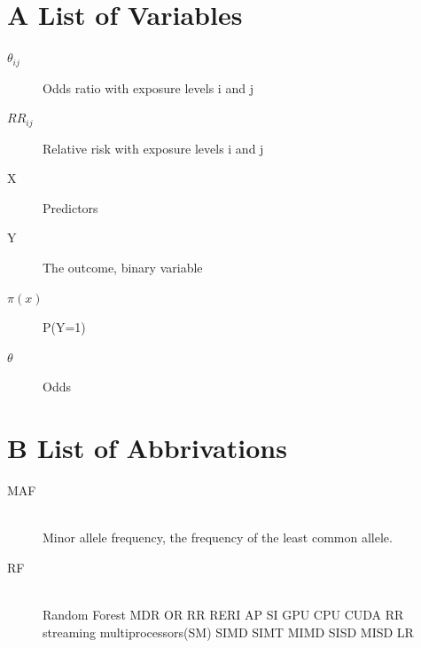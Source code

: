 \documentclass[10pt,a4paper]{report}
\begin{document}
\section{A List of Variables}

\begin{description}
\item[$\theta_{ij}$]
  Odds ratio with exposure levels i and j
\item[$RR_{ij}$]
  Relative risk with exposure levels i and j
\item[X]
  Predictors
\item[Y]
  The outcome, binary variable
\item[$\pi(x)$]
  P(Y=1)
\item[$\theta$]
  Odds
\end{description}

\section{B List of Abbrivations}

\begin{description}
\item[MAF] \hfill \\
  Minor allele frequency, the frequency of the least common allele.
\item[RF] \hfill \\
  Random Forest
  MDR
  OR
  RR
  RERI
  AP
  SI
  GPU
  CPU
  CUDA
  RR
  streaming multiprocessors(SM)
  SIMD
  SIMT
  MIMD
  SISD
  MISD
  LR
\end{description}



\newpage


\end{document}
